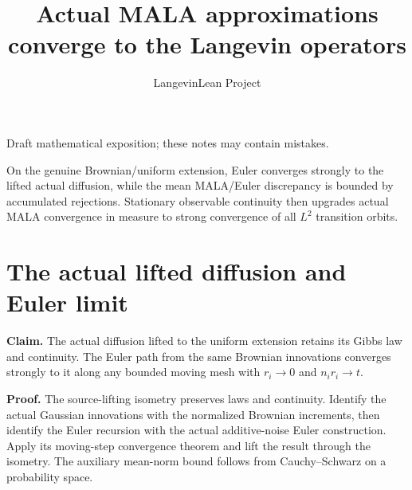\documentclass[11pt,a4paper]{article}
\title{\texorpdfstring{Actual MALA approximations converge to the Langevin operators}{Actual MALA approximations converge to the Langevin operators}}
\author{LangevinLean Project}
\date{}
\begin{document}
\maketitle
Draft mathematical exposition; these notes may contain mistakes.


On the genuine Brownian/\allowbreak{}uniform extension, Euler converges strongly to the lifted actual diffusion, while the mean MALA/\allowbreak{}Euler discrepancy is bounded by accumulated rejections. Stationary observable continuity then upgrades actual MALA convergence in measure to strong convergence of all \(L^2\) transition orbits.


\section{\texorpdfstring{The actual lifted diffusion and Euler limit}{The actual lifted diffusion and Euler limit}}


\textbf{Claim.} The actual diffusion lifted to the uniform extension retains its Gibbs law and continuity. The Euler path from the same Brownian innovations converges strongly to it along any bounded moving mesh with \(r_i\to0\) and \(n_ir_i\to t\).



\textbf{Proof.} The source-lifting isometry preserves laws and continuity. Identify the actual Gaussian innovations with the normalized Brownian increments, then identify the Euler recursion with the actual additive-noise Euler construction. Apply its moving-step convergence theorem and lift the result through the isometry. The auxiliary mean-norm bound follows from Cauchy–Schwarz on a probability space.
\end{document}
